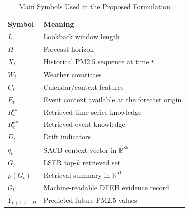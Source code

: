 \begin{table}[!t]
\centering
\caption{Main Symbols Used in the Proposed Formulation}
\label{tab:symbols}
\begin{tabular}{ll}
\toprule
Symbol & Meaning \\
\midrule
$L$ & Lookback window length \\
$H$ & Forecast horizon \\
$X_t$ & Historical PM2.5 sequence at time $t$ \\
$W_t$ & Weather covariates \\
$C_t$ & Calendar/context features \\
$E_t$ & Event context available at the forecast origin \\
$R^{ts}_t$ & Retrieved time-series knowledge \\
$R^{ev}_t$ & Retrieved event knowledge \\
$D_t$ & Drift indicators \\
$q_t$ & SACB context vector in $\mathbb{R}^{85}$ \\
$G_t$ & LSER top-$k$ retrieved set \\
$\rho(G_t)$ & Retrieval summary in $\mathbb{R}^{51}$ \\
$\mathcal{O}_t$ & Machine-readable DFEH evidence record \\
$\hat{Y}_{t+1:t+H}$ & Predicted future PM2.5 values \\
\bottomrule
\end{tabular}
\end{table}
